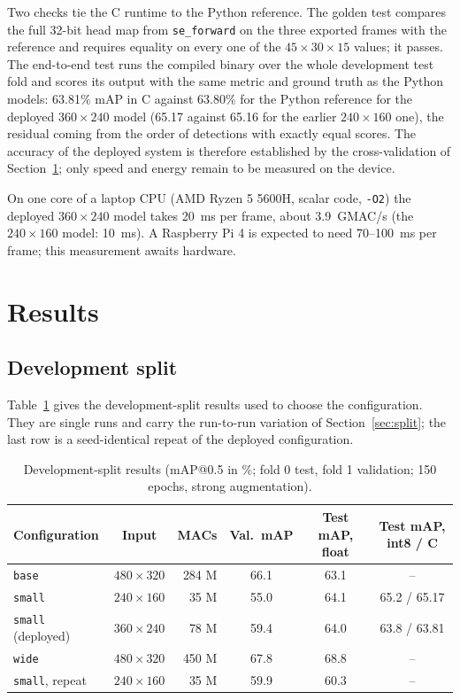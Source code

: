 \documentclass[11pt,a4paper]{article}
\newcommand{\cfg}[1]{\texttt{#1}}
\begin{document}
Two checks tie the C runtime to the Python reference. The golden test
compares the full 32-bit head map from \texttt{se\_forward} on the three
exported frames with the reference and requires equality on every one of the
$45 \times 30 \times 15$ values; it passes. The end-to-end test runs the
compiled binary over the whole development test fold and scores its output
with the same metric and ground truth as the Python models: 63.81\% mAP in C
against 63.80\% for the Python reference for the deployed $360 \times 240$
model (65.17 against 65.16 for the earlier $240 \times 160$ one), the
residual coming from the order of detections with exactly equal scores. The accuracy of the deployed system
is therefore established by the cross-validation of
Section~\ref{sec:results}; only speed and energy remain to be measured on
the device.

On one core of a laptop CPU (AMD Ryzen 5 5600H, scalar code, \texttt{-O2})
the deployed $360 \times 240$ model takes \SI{20}{ms} per frame, about
3.9~GMAC/s (the $240 \times 160$ model: \SI{10}{ms}). A Raspberry Pi 4 is
expected to need 70--100~ms per frame; this measurement awaits hardware.

\section{Results}
\label{sec:results}

\subsection{Development split}

Table~\ref{tab:dev} gives the development-split results used to choose the
configuration. They are single runs and carry the run-to-run variation of
Section~\ref{sec:split}; the last row is a seed-identical repeat of the
deployed configuration.

\begin{table}[h]
  \centering
  \small
  \begin{tabular}{lcrccc}
    \toprule
    Configuration & Input & MACs & Val.\ mAP & Test mAP, float & Test mAP, int8 / C \\
    \midrule
    \cfg{base} & $480{\times}320$ & 284 M & 66.1 & 63.1 & -- \\
    \cfg{small} & $240{\times}160$ & 35 M & 55.0 & 64.1 & 65.2 / 65.17 \\
    \cfg{small} (deployed) & $360{\times}240$ & 78 M & 59.4 & 64.0 & 63.8 / 63.81 \\
    \cfg{wide} & $480{\times}320$ & 450 M & 67.8 & 68.8 & -- \\
    \cfg{small}, repeat & $240{\times}160$ & 35 M & 59.9 & 60.3 & -- \\
    \bottomrule
  \end{tabular}
  \caption{Development-split results (mAP@0.5 in \%; fold 0 test, fold 1
  validation; 150 epochs, strong augmentation).}
  \label{tab:dev}
\end{table}
\end{document}
